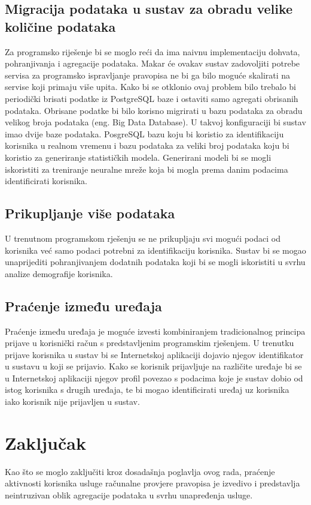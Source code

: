\documentclass[times, utf8, zavrsni]{fer}
\begin{document}
\section{Migracija podataka u sustav za obradu velike količine podataka}
Za programsko riješenje bi se moglo reći da ima naivnu implementaciju dohvata,
pohranjivanja i agregacije podataka. Makar će ovakav sustav zadovoljiti potrebe
servisa za programsko ispravljanje pravopisa ne bi ga bilo moguće skalirati na
servise koji primaju više upita. Kako bi se otklonio ovaj problem bilo trebalo
bi periodički brisati podatke iz PostgreSQL baze i ostaviti samo agregati
obrisanih podataka. Obrisane podatke bi bilo korisno migrirati u bazu podataka
za obradu velikog broja podataka (eng. Big Data Database). U takvoj
konfiguraciji bi sustav imao dvije baze podataka. PosgreSQL bazu koju bi
koristio za identifikaciju korisnika u realnom vremenu i bazu podataka za veliki
broj podataka koju bi koristio za generiranje statističkih modela. Generirani
modeli bi se mogli iskoristiti za treniranje neuralne mreže koja bi mogla prema
danim podacima identificirati korisnika.

\section{Prikupljanje više podataka}
U trenutnom programskom rješenju se ne prikupljaju svi mogući podaci od
korisnika već samo podaci potrebni za identifikaciju korisnika. Sustav bi se
mogao unaprijediti pohranjivanjem dodatnih podataka koji bi se mogli iskoristiti
u svrhu analize demografije korisnika.

\section{Praćenje između uređaja}
Praćenje između uređaja je moguće izvesti kombiniranjem tradicionalnog principa
prijave u korisnički račun s predstavljenim programskim rješenjem. U trenutku
prijave korisnika u sustav bi se Internetskoj aplikaciji dojavio njegov
identifikator u sustavu u koji se prijavio. Kako se korisnik prijavljuje na
različite uređaje bi se u Internetskoj aplikaciji njegov profil povezao s
podacima koje je sustav dobio od istog korisnika s drugih uređaja, te bi mogao
identificirati uređaj uz korisnika iako korisnik nije prijavljen u sustav.

\chapter{Zaključak}
Kao što se moglo zaključiti kroz dosadašnja poglavlja ovog rada, praćenje
aktivnosti korisnika usluge računalne provjere pravopisa je izvedivo i
predstavlja neintruzivan oblik agregacije podataka u svrhu unapređenja usluge.
\end{document}
